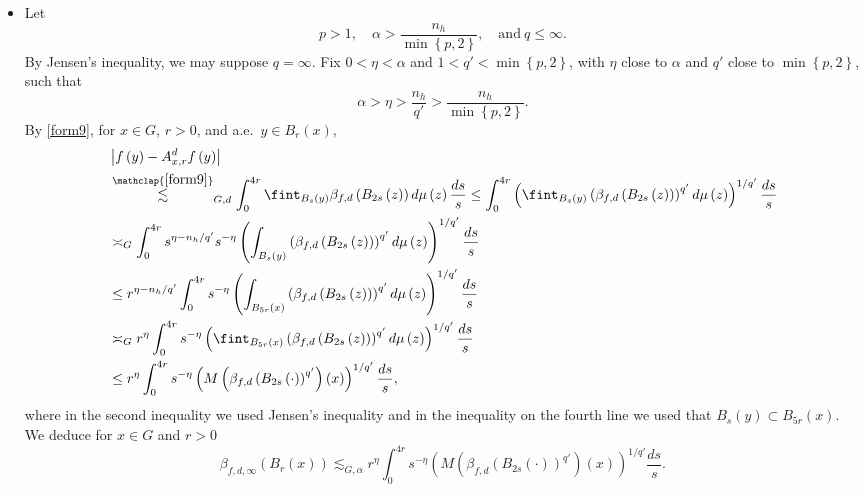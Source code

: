 \documentclass[11pt,reqno]{amsart}
\newcommand{\1}{\mathbf 1}
\begin{document}
\begin{itemize}
\item[Case 2.]Let
\[
p>1, \quad \alpha>\frac{n_h}{\min\left\{p,2\right\}}, \quad\mathrm{and}~ q \le \infty.
\]
By Jensen's inequality, we may suppose $q=\infty$. Fix $0<\eta<\alpha$ and $1<q'< \min\left\{p,2\right\}$, with $\eta$ close to $\alpha$ and $q'$ close to $\min\left\{p,2\right\}$, such that
\[
\alpha>\eta>\frac{n_h}{q'}>\frac{n_h}{\min\left\{p,2\right\}}.
\]
By \eqref{form9}, for $x\in G$, $r>0$, and a.e.~$y\in B_r\left(x\right)$,
\begin{align*}
&\left|f\left(y\right) - A^d_{x,r}f\left(y\right)\right|\\ &\stackrel{\mathclap{\eqref{form9}}}\lesssim_{G,d} \int_0^{4r} \fint_{B_s\left(y\right)} \beta_{f,d}\left(B_{2s}\left(z\right)\right)  d\mu\left(z\right)  \frac{ds}{s}\le \int_0^{4r} \left(\fint_{B_s\left(y\right)} \left(\beta_{f,d}\left(B_{2s}\left(z\right)\right)\right)^{q'}d\mu\left(z\right)\right)^{1/q'}   \frac{ds}{s}\\
&\asymp_G\int_0^{4r} s^{\eta-n_h/q'}s^{-\eta}\left(\int_{B_s\left(y\right)} \left(\beta_{f,d}\left(B_{2s}\left(z\right)\right)\right)^{q'}d\mu\left(z\right)\right)^{1/q'}   \frac{ds}{s}\\
&\le r^{\eta-n_h/q'}\int_0^{4r} s^{-\eta}\left(\int_{B_{5r}\left(x\right)} \left(\beta_{f,d}\left(B_{2s}\left(z\right)\right)\right)^{q'}d\mu\left(z\right)\right)^{1/q'}   \frac{ds}{s}\\
&\asymp_G r^{\eta}\int_0^{4r}s^{-\eta}\left(\fint_{B_{5r}\left(x\right)} \left(\beta_{f,d}\left(B_{2s}\left(z\right)\right)\right)^{q'}d\mu\left(z\right)\right)^{1/q'}   \frac{ds}{s}\\
&\le r^{\eta}\int_0^{4r}s^{-\eta}\left(M\left(\beta_{f,d}\left(B_{2s}\left(\cdot\right)\right)^{q'}\right)\left(x\right)\right)^{1/q'}   \frac{ds}{s},
\end{align*}
where in the second inequality we used Jensen's inequality and in the inequality on the fourth line we used that $B_s\left(y\right)\subset B_{5r}\left(x\right)$. We deduce for $x\in G$ and $r>0$
\[
\beta_{f,d,\infty}\left(B_r\left(x\right)\right)\lesssim_{G,\alpha}r^{\eta}\int_0^{4r}s^{-\eta}\left(M\left(\beta_{f,d}\left(B_{2s}\left(\cdot\right)\right)^{q'}\right)\left(x\right)\right)^{1/q'}   \frac{ds}{s}.
\]


\end{itemize}
\end{document}
